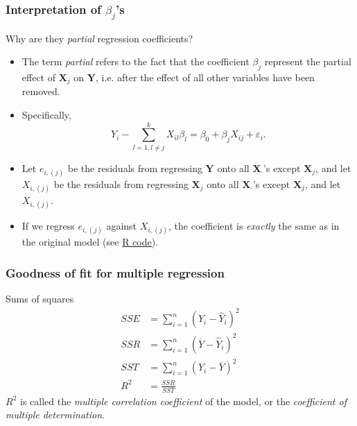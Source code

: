 \documentclass[handout]{beamer}
\begin{document}
   \begin{frame} \frametitle{Interpretation of $\beta_j$'s}

   \begin{block}
   {Why are they {\em partial} regression coefficients?}
   \begin{itemize}

   \item The term {\em partial} refers to the fact that the coefficient $\beta_j$
   represent the partial effect of $\pmb{X}_j$ on $\pmb{Y}$, i.e. after the effect of all other variables have been removed.

   \item Specifically,
   $$
   Y_i - \sum_{l=1, l \neq j}^k X_{il} \beta_l = \beta_0 + \beta_j X_{ij} + \varepsilon_i.$$


   \item Let $e_{i,(j)}$ be the residuals from regressing $\pmb{Y}$ onto all $\pmb{X}_{\cdot}$'s except $\pmb{X}_j$, and let $X_{i,(j)}$ be the residuals from
   regressing $\pmb{X}_j$ onto all $\pmb{X}_{\cdot}$'s except $\pmb{X}_j$, and let $X_{i,(j)}$.

   \item If we regress $e_{i,(j)}$ against $X_{i,(j)}$, the coefficient
   is {\em exactly} the same as in the original model (see \href{http://stats191.stanford.edu/multiple.html}{R code}).

   \end{itemize}
   \end{block}
   \end{frame}


   \begin{frame} \frametitle{Goodness of fit for multiple regression}

   \begin{block}
   {Sums of squares}
   $$
   \begin{aligned}
   SSE &= \sum_{i=1}^n(Y_i - \widehat{Y}_i)^2 \\
   SSR &= \sum_{i=1}^n(\overline{Y} - \widehat{Y}_i)^2 \\
   SST &= \sum_{i=1}^n(Y_i - \overline{Y})^2 \\
   R^2 &= \frac{SSR}{SST}
   \end{aligned}
   $$
   $R^2$ is called the {\em multiple correlation coefficient} of the model, or
   the {\em coefficient of multiple determination}.
   \end{block}
   \end{frame}
\end{document}
